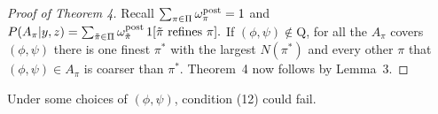 \documentclass[aoas,preprint]{imsart}
\newtheorem{theorem}{Theorem}
\begin{document}






\begin{proof}[Proof of Theorem 4]

Recall $\sum_{\pi \in \Pi} \omega^{\rm post}_{ \pi} = 1$ and $P(A_\pi|y,z) = 
\sum_{\tilde \pi \in \Pi} \omega^{\rm post}_{\tilde \pi} \,  1[ {\mbox {\rm $\tilde \pi$ refines $\pi$}} ].$  If $(\phi, \psi) \notin \text{Q}$, for all the $A_\pi$ covers $(\phi, \psi)$ there is one finest $\pi^*$ with the largest $N(\pi^*)$ and every other $\pi$ that $(\phi,\psi) \in A_\pi$ is coarser than $\pi^*$.  Theorem~4 now follows by Lemma~3.


\end{proof}

Under some choices of $(\phi,\psi)$, condition (12) could fail.  

 
\end{document}
